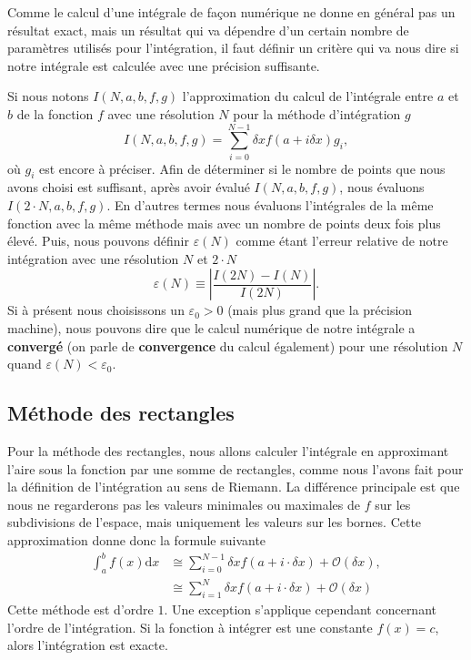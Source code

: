 \documentclass[a4paper,12pt]{book}
\newcommand{\dd}{\mathrm{d}}
\begin{document}
Comme le calcul d'une intégrale de façon numérique ne donne en général pas un résultat exact, mais
un résultat qui va dépendre d'un certain nombre de paramètres utilisés pour l'intégration, il faut
définir un critère qui va nous dire si notre intégrale est calculée avec une précision suffisante.

Si nous notons $I(N,a,b,f,g)$ l'approximation du calcul de l'intégrale entre $a$ et $b$ de la fonction $f$
avec une résolution $N$ pour la méthode d'intégration $g$
\begin{equation}
 I(N,a,b,f,g)=\sum_{i=0}^{N-1} \delta x f(a+i\delta x) g_i,
\end{equation}
où $g_i$ est encore à préciser. Afin de déterminer si le nombre de points que nous avons choisi est suffisant, 
après avoir évalué $I(N,a,b,f,g)$, nous évaluons $I(2\cdot N,a,b,f,g)$. En d'autres termes nous évaluons l'intégrales de la même fonction avec la même 
méthode mais avec un nombre de points deux fois plus élevé.
Puis, nous pouvons définir $\varepsilon(N)$ comme étant l'erreur relative de notre intégration avec une résolution $N$ et $2\cdot N$
\begin{equation}
 \varepsilon(N)\equiv\left|\frac{I(2N)-I(N)}{I(2N)}\right|.
\end{equation}
Si à présent nous choisissons un $\varepsilon_0>0$ (mais plus grand que la précision machine), nous pouvons dire que
le calcul numérique de notre intégrale a \textbf{convergé} (on parle de \textbf{convergence} du calcul également) pour une résolution $N$ quand $\varepsilon(N)<\varepsilon_0$.


\subsection{Méthode des rectangles}
Pour la méthode des rectangles, nous allons calculer l'intégrale en approximant l'aire sous la fonction par une somme de rectangles,
comme nous l'avons fait pour la définition de l'intégration au sens de Riemann.
La différence principale est que nous ne regarderons pas les valeurs minimales ou maximales de $f$ sur les 
subdivisions de l'espace, mais uniquement les valeurs sur les bornes. Cette approximation donne donc la formule suivante
\begin{align}
 \int_a^bf(x)\dd x&\cong\sum_{i=0}^{N-1} \delta x f(a+i\cdot\delta x)+\mathcal{O}(\delta x),\\
 &\cong\sum_{i=1}^{N} \delta x f(a+i\cdot\delta x)+\mathcal{O}(\delta x)\label{eq_rect_gauche}
\end{align}
Cette méthode est d'ordre $1$. Une exception s'applique cependant concernant l'ordre de l'intégration.
Si la fonction à intégrer est une constante $f(x)=c$, alors l'intégration est exacte.
\end{document}
